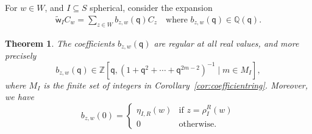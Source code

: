 \documentclass[11pt]{article}
\theoremstyle{plain}
\newtheorem{thm}{Theorem}[section]
\theoremstyle{definition}
\numberwithin{equation}{section}
\def\tw{\widetilde{\mathsf{w}}_I}
\def\QQ{\mathbb{Q}}
\def\ZZ{\mathbb{Z}}
\newcommand{\sq}{\mathsf{q}}
\begin{document}
For $w\in W$, and $I\subseteq S$ spherical, consider the expansion
\begin{align}\label{eq:expand}
\tw C_w=\sum_{z\in W}b_{z,w}(\sq)C_z\quad\text{where $b_{z,w}(\sq)\in\QQ(\sq)$.}
\end{align}


\begin{thm}\label{thm:specialisation}
The coefficients $b_{z,w}(\sq)$ are regular at all real values, and more precisely
$$
b_{z,w}(\sq)\in\ZZ[\sq,(1+\sq^2+\cdots+\sq^{2m-2})^{-1}\mid m\in M_I],
$$
where $M_I$ is the finite set of integers in Corollary~\ref{cor:coefficientring}. Moreover, we have
$$
b_{z,w}(0)=\begin{cases}
\eta_{I,R}(w)&\text{if $z=\rho_I^R(w)$}\\
0&\text{otherwise}.
\end{cases}
$$
\end{thm}
\end{document}
